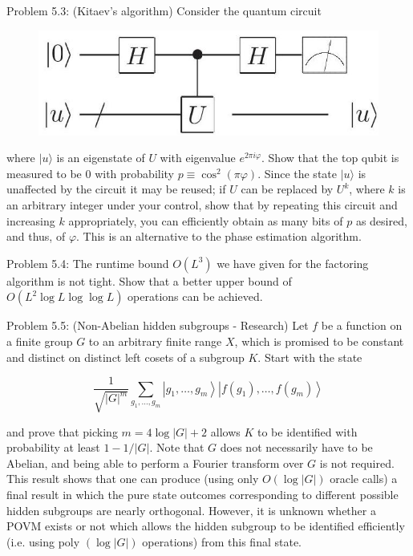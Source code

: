 Problem 5.3: (Kitaev's algorithm) Consider the quantum circuit

\begin{figure}
\centering
\includegraphics[width=0.75\linewidth]{Images/2024_05_17_6977ce60de6fd27aef98g-277}
\end{figure}

where $|u\rangle$ is an eigenstate of $U$ with eigenvalue $e^{2 \pi i \varphi}$. Show that the top qubit is\\
measured to be 0 with probability $p \equiv \cos ^{2}(\pi \varphi)$. Since the state $|u\rangle$ is unaffected by the circuit it may be reused; if $U$ can be replaced by $U^{k}$, where $k$ is an arbitrary integer under your control, show that by repeating this circuit and increasing $k$ appropriately, you can efficiently obtain as many bits of $p$ as desired, and thus, of $\varphi$. This is an alternative to the phase estimation algorithm.

Problem 5.4: The runtime bound $O\left(L^{3}\right)$ we have given for the factoring algorithm is not tight. Show that a better upper bound of $O\left(L^{2} \log L \log \log L\right)$ operations can be achieved.

Problem 5.5: (Non-Abelian hidden subgroups - Research) Let $f$ be a function on a finite group $G$ to an arbitrary finite range $X$, which is promised to be constant and distinct on distinct left cosets of a subgroup $K$. Start with the state

\begin{equation*}
\frac{1}{\sqrt{|G|^{m}}} \sum_{g_{1}, \ldots, g_{m}}\left|g_{1}, \ldots, g_{m}\right\rangle\left|f\left(g_{1}\right), \ldots, f\left(g_{m}\right)\right\rangle \tag{5.80}
\end{equation*}

and prove that picking $m=4 \log |G|+2$ allows $K$ to be identified with probability at least $1-1 /|G|$. Note that $G$ does not necessarily have to be Abelian, and being able to perform a Fourier transform over $G$ is not required. This result shows that one can produce (using only $O(\log |G|)$ oracle calls) a final result in which the pure state outcomes corresponding to different possible hidden subgroups are nearly orthogonal. However, it is unknown whether a POVM exists or not which allows the hidden subgroup to be identified efficiently (i.e. using poly $(\log |G|)$ operations) from this final state.

